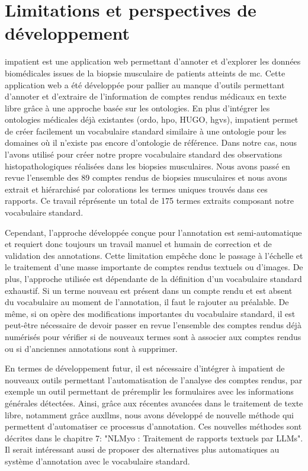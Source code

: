 \section{Limitations et perspectives de développement}
\gls{impatient} est une application web permettant d'annoter et d'explorer les données biomédicales issues de la biopsie musculaire de patients atteints de \gls{mc}. Cette application web a été développée pour pallier au manque d'outils permettant d'annoter et d'extraire de l'information de comptes rendus médicaux en texte libre grâce à une approche basée sur les ontologies. En plus d'intégrer les ontologies médicales déjà existantes (\gls{ordo}, \gls{hpo}, HUGO, \gls{hgvs}), \gls{impatient} permet de créer facilement un vocabulaire standard similaire à une ontologie pour les domaines où il n'existe pas encore d'ontologie de référence. Dans notre cas, nous l'avons utilisé pour créer notre propre vocabulaire standard des observations histopathologiques réalisées dans les biopsies musculaires. Nous avons passé en revue l'ensemble des 89 comptes rendus de biopsies musculaires et nous avons extrait et hiérarchisé par colorations les termes uniques trouvés dans ces rapports. Ce travail réprésente un total de 175 termes extraits composant notre vocabulaire standard.


Cependant, l'approche développée conçue pour l'annotation est semi-automatique et requiert donc toujours un travail manuel et humain de correction et de validation des annotations. Cette limitation empêche donc le passage à l'échelle et le traitement d'une masse importante de comptes rendus textuels ou d'images. De plus, l'approche utilisée est dépendante de la définition d'un vocabulaire standard exhaustif. Si un terme nouveau est présent dans un compte rendu et est absent du vocabulaire au moment de l'annotation, il faut le rajouter au préalable. De même, si on opère des modifications importantes du vocabulaire standard, il est peut-être nécessaire de devoir passer en revue l'ensemble des comptes rendus déjà numérisés pour vérifier si de nouveaux termes sont à associer aux comptes rendus ou si d'anciennes annotations sont à supprimer.


En termes de développement futur, il est nécessaire d'intégrer à \gls{impatient} de nouveaux outils permettant l'automatisation de l'analyse des comptes rendus, par exemple un outil permettant de préremplir les formulaires avec les informations générales détectées. Ainsi, grâce aux récentes avancées dans le traitement de texte libre, notamment grâce aux\gls{llms}, nous avons développé de nouvelle méthode qui permettent d'automatiser ce processus d'annotation. Ces nouvelles méthodes sont décrites dans le chapitre 7: "NLMyo : Traitement de rapports textuels par LLMs". Il serait intéressant aussi de proposer des alternatives plus automatiques au système d'annotation avec le vocabulaire standard.


